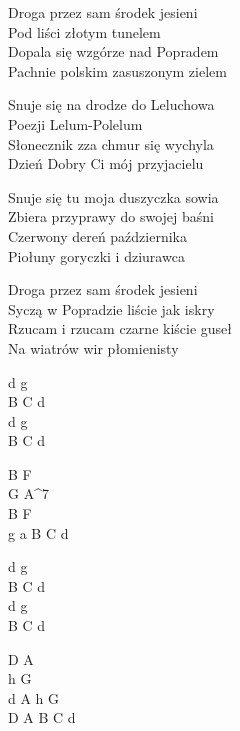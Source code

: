 \begin{text}
    Droga przez sam środek jesieni\\
    Pod liści złotym tunelem\\
    Dopala się wzgórze nad Popradem\\
    Pachnie polskim zasuszonym zielem

    \vin Snuje się na drodze do Leluchowa\\
    \vin Poezji Lelum-Polelum\\
    \vin Słonecznik zza chmur się wychyla\\
    \vin Dzień Dobry Ci mój przyjacielu

    Snuje się tu moja duszyczka sowia\\
    Zbiera przyprawy do swojej baśni\\
    Czerwony dereń października\\
    Piołuny goryczki i dziurawca

    Droga przez sam środek jesieni\\
    Syczą w Popradzie liście jak iskry\\
    Rzucam i rzucam czarne kiście guseł\\
    Na wiatrów wir płomienisty
\end{text}
\begin{chord}
    d g\\
    B C d\\
    d g\\
    B C d

    B F\\
    G A^7\\
    B F\\
    g a B C d

    d g\\
    B C d\\
    d g\\
    B C d

    D A\\
    h G\\
    d A h G\\
    D A B C d
\end{chord}